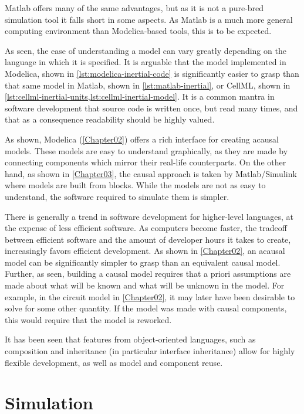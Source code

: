 \documentclass[\rootfolder/main.tex]{subfiles}
\begin{document}
Matlab offers many of the same advantages, but as it is not a pure-bred simulation tool it falls short in some aspects.
As Matlab is a much more general computing environment than Modelica-based tools, this is to be expected.

As seen, the ease of understanding a model can vary greatly depending on the language in which it is specified.
It is arguable that the model implemented in Modelica, shown in \cref{lst:modelica-inertial-code} is significantly easier to grasp than that same model in Matlab, shown in \cref{lst:matlab-inertial}, or CellML, shown in \cref{lst:cellml-inertial-units,lst:cellml-inertial-model}. 
It is a common mantra in software development that source code is written once, but read many times, and that as a consequence readability should be highly valued.

As shown, Modelica (\cref{Chapter02}) offers a rich interface for creating acausal models.
These models are easy to understand graphically, as they are made by connecting components which mirror their real-life counterparts.
On the other hand, as shown in \cref{Chapter03}, the causal approach is taken by Matlab/Simulink where models are built from blocks.
While the models are not as easy to understand, the software required to simulate them is simpler.

There is generally a trend in software development for higher-level languages, at the expense of less efficient software.
As computers become faster, the tradeoff between efficient software and the amount of developer hours it takes to create, increasingly favors efficient development.
As shown in \cref{Chapter02}, an acausal model can be significantly simpler to grasp than an equivalent causal model.
Further, as seen, building a causal model requires that a priori assumptions are made about what will be known and what will be unknown in the model.
For example, in the circuit model in \cref{Chapter02}, it may later have been desirable to solve for some other quantity.
If the model was made with causal components, this would require that the model is reworked.

It has been seen that features from object-oriented languages, such as composition and inheritance (in particular interface inheritance) allow for highly flexible development, as well as model and component reuse.

\section{Simulation}
\end{document}
